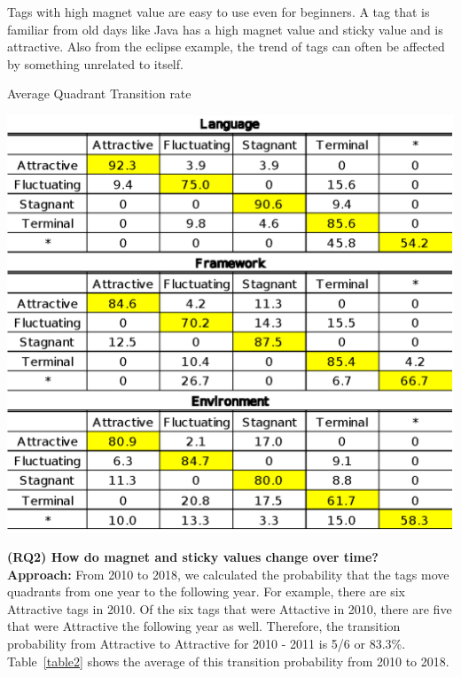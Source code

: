 \documentclass[english,preprint,JIP]{ipsj}
\begin{document}
 Tags with high magnet value are easy to use even for beginners. A tag that is familiar from old days like Java has a high magnet value and sticky value and is attractive. Also from the eclipse example, the trend of tags can often be affected by something unrelated to itself.
 \smallskip\smallskip
\medskip





\begin{table}[t]
 \centering
 \caption{Average Quadrant Transition rate}
 \includegraphics[width=1.0\hsize]{img/averageAFST.eps} 
 \label{table2} 
\end{table}

\textbf{(RQ2) How do magnet and sticky values change over time?} \\
\smallskip
\textbf{Approach:}
From 2010 to 2018, we calculated the probability that the tags move quadrants from one year to the following year. For example, there are six Attractive tags in 2010. Of the six tags that were Attactive in 2010, there are five that were Attractive the following year as well. Therefore, the transition probability from Attractive to Attractive for 2010 - 2011 is 5/6 or 83.3\%. Table~\ref{table2} shows the average of this transition probability from 2010 to 2018.
\end{document}
